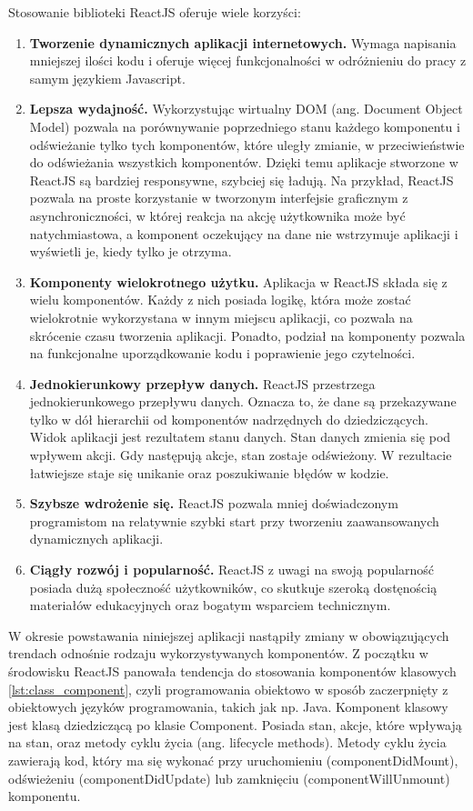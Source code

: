 \documentclass{sprz}
\begin{document}
Stosowanie biblioteki ReactJS oferuje wiele korzyści:
\begin{enumerate}
  \item \textbf{Tworzenie dynamicznych aplikacji internetowych.} Wymaga napisania mniejszej ilości kodu i oferuje więcej funkcjonalności w odróżnieniu do pracy z samym językiem Javascript.
  \item \textbf{Lepsza wydajność.} Wykorzystując wirtualny DOM (ang. Document Object Model) pozwala na porównywanie poprzedniego stanu każdego komponentu i odświeżanie tylko tych komponentów, które uległy zmianie, w przeciwieństwie do odświeżania wszystkich komponentów. Dzięki temu aplikacje stworzone w ReactJS są bardziej responsywne, szybciej się ładują. Na przykład, ReactJS pozwala na proste korzystanie w tworzonym interfejsie graficznym z asynchroniczności, w której reakcja na akcję użytkownika może być natychmiastowa, a komponent oczekujący na dane nie wstrzymuje aplikacji i wyświetli je, kiedy tylko je otrzyma.
  \item \textbf{Komponenty wielokrotnego użytku.} Aplikacja w ReactJS składa się z wielu komponentów. Każdy z nich posiada logikę, która może zostać wielokrotnie wykorzystana w innym miejscu aplikacji, co pozwala na skrócenie czasu tworzenia aplikacji. Ponadto, podział na komponenty pozwala na funkcjonalne uporządkowanie kodu i poprawienie jego czytelności.
  \item \textbf{Jednokierunkowy przepływ danych.} ReactJS przestrzega jednokierunkowego przepływu danych. Oznacza to, że dane są przekazywane tylko w dół hierarchii od komponentów nadrzędnych do dziedziczących. Widok aplikacji jest rezultatem stanu danych. Stan danych zmienia się pod wpływem akcji. Gdy następują akcje, stan zostaje odświeżony. W rezultacie łatwiejsze staje się unikanie oraz poszukiwanie błędów w kodzie.
  \item \textbf{Szybsze wdrożenie się.} ReactJS pozwala mniej doświadczonym programistom na relatywnie szybki start przy tworzeniu zaawansowanych dynamicznych aplikacji.
  \item \textbf{Ciągły rozwój i popularność.} ReactJS z uwagi na swoją popularność posiada dużą społeczność użytkowników, co skutkuje szeroką dostęnością materiałów edukacyjnych oraz bogatym wsparciem technicznym.
\end{enumerate}

W okresie powstawania niniejszej aplikacji nastąpiły zmiany w obowiązujących trendach odnośnie rodzaju wykorzystywanych komponentów. Z początku w środowisku ReactJS panowała tendencja do stosowania komponentów klasowych \ref{lst:class_component}, czyli programowania obiektowo w sposób zaczerpnięty z obiektowych języków programowania, takich jak np. Java. Komponent klasowy jest klasą dziedziczącą po klasie Component. Posiada stan, akcje, które wpływają na stan, oraz metody cyklu życia (ang. lifecycle methods). Metody cyklu życia zawierają kod, który ma się wykonać przy uruchomieniu (componentDidMount), odświeżeniu (componentDidUpdate) lub zamknięciu (componentWillUnmount) komponentu.
\end{document}
